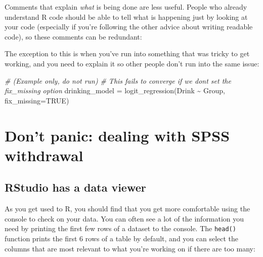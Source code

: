 \documentclass[
]{book}
\newenvironment{Shaded}{\begin{snugshade}}{\end{snugshade}}
\newcommand{\AttributeTok}[1]{\textcolor[rgb]{0.77,0.63,0.00}{#1}}
\newcommand{\CommentTok}[1]{\textcolor[rgb]{0.56,0.35,0.01}{\textit{#1}}}
\newcommand{\ConstantTok}[1]{\textcolor[rgb]{0.00,0.00,0.00}{#1}}
\newcommand{\FunctionTok}[1]{\textcolor[rgb]{0.00,0.00,0.00}{#1}}
\newcommand{\NormalTok}[1]{#1}
\newcommand{\OtherTok}[1]{\textcolor[rgb]{0.56,0.35,0.01}{#1}}
\newcommand{\SpecialCharTok}[1]{\textcolor[rgb]{0.00,0.00,0.00}{#1}}
\begin{document}
Comments that explain \emph{what} is being done are less useful. People
who already understand R code should be able to tell what is
happening just by looking at your code (especially if you're following
the other advice about writing readable code), so these comments
can be redundant:

\begin{Shaded}
\end{Shaded}

The exception to this is when you've run into something that
was tricky to get working, and you need to explain it so other
people don't run into the same issue:

\begin{Shaded}
\begin{Highlighting}[]
\CommentTok{\# (Example only, do not run)}
\CommentTok{\# This fails to converge if we don\textquotesingle{}t set the fix\_missing option}
\NormalTok{drinking\_model }\OtherTok{=} \FunctionTok{logit\_regression}\NormalTok{(Drink }\SpecialCharTok{\textasciitilde{}}\NormalTok{ Group, }\AttributeTok{fix\_missing=}\ConstantTok{TRUE}\NormalTok{)}
\end{Highlighting}
\end{Shaded}

\hypertarget{dont-panic-dealing-with-spss-withdrawal}{%
\section{Don't panic: dealing with SPSS withdrawal}\label{dont-panic-dealing-with-spss-withdrawal}}

\hypertarget{rstudio-has-a-data-viewer}{%
\subsection{RStudio has a data viewer}\label{rstudio-has-a-data-viewer}}

As you get used to R, you should find that you get more comfortable
using the console to check on your data. You can often see
a lot of the information you need by printing the first few
rows of a dataset to the console. The \texttt{head()} function prints
the first 6 rows of a table by default, and you can select the columns that
are most relevant to what you're working on if there are too many:
\end{document}
